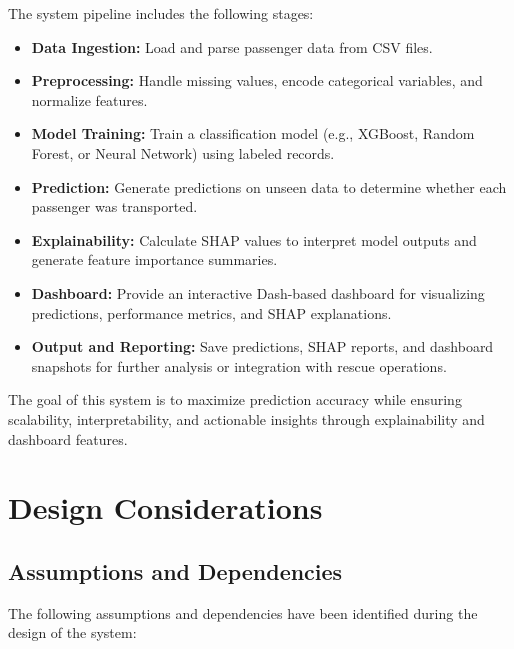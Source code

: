 \documentclass[15pt]{article}
\begin{document}
The system pipeline includes the following stages:
\begin{itemize}
    \item \textbf{Data Ingestion:} Load and parse passenger data from CSV files.
    \item \textbf{Preprocessing:} Handle missing values, encode categorical variables, and normalize features.
    \item \textbf{Model Training:} Train a classification model (e.g., XGBoost, Random Forest, or Neural Network) using labeled records.
    \item \textbf{Prediction:} Generate predictions on unseen data to determine whether each passenger was transported.
    \item \textbf{Explainability:} Calculate SHAP values to interpret model outputs and generate feature importance summaries.
    \item \textbf{Dashboard:} Provide an interactive Dash-based dashboard for visualizing predictions, performance metrics, and SHAP explanations.
    \item \textbf{Output and Reporting:} Save predictions, SHAP reports, and dashboard snapshots for further analysis or integration with rescue operations.
\end{itemize}

The goal of this system is to maximize prediction accuracy while ensuring scalability, interpretability, and actionable insights through explainability and dashboard features.

\section{Design Considerations}

\subsection{Assumptions and Dependencies}
The following assumptions and dependencies have been identified during the design of the system:
\end{document}
